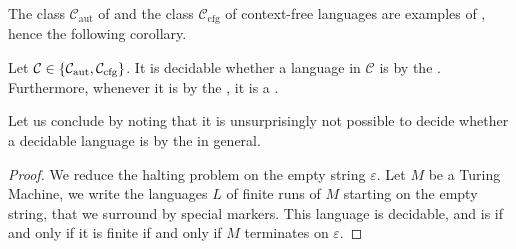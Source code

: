 The class $\mathcal{C}_\text{aut}$ of  and the class
$\mathcal{C}_{\text{cfg}}$ of context-free languages are examples of
, hence the following corollary.

\begin{corollary}
    \label{aut-cfg-infix:cor}
    Let $\mathcal{C} \in \{  \mathcal{C}_\text{aut}, \mathcal{C}_{\text{cfg}} \}$.
    It is decidable whether a language in $\mathcal{C}$ is 
    by the .
    Furthermore, whenever it is  by the ,
    it is a .
\end{corollary}


\begin{remark}
	Let us conclude by noting that it is unsurprisingly not possible to decide
	whether a decidable language is  by the  in general. 
	
\end{remark}
\begin{proof}
    We reduce the halting problem on the empty string $\varepsilon$.
    Let $M$ be a Turing Machine, we write the languages $L$ of finite runs
    of $M$ starting on the empty string,
    that we surround by special markers. This language is decidable,
    and 
    is
     if and only if it is finite
    if and only if $M$ terminates on $\varepsilon$.
\end{proof}
